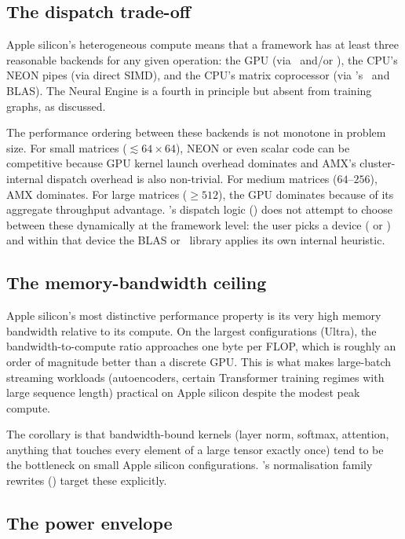 \subsection{The dispatch trade-off}
\label{ssec:apple_silicon:ml_dispatch}

Apple silicon's heterogeneous compute means that a framework has at
least three reasonable backends for any given operation: the GPU
(via \MLX\ and/or \MPSGraph), the CPU's NEON pipes (via direct
SIMD), and the CPU's matrix coprocessor (via \Accelerate's \BNNS\
and BLAS). The Neural Engine is a fourth in principle but absent
from training graphs, as discussed.

The performance ordering between these backends is not monotone in
problem size. For small matrices ($\lesssim 64\times 64$), NEON or
even scalar code can be competitive because GPU kernel launch
overhead dominates and AMX's cluster-internal dispatch overhead is
also non-trivial. For medium matrices ($64$--$256$), AMX dominates.
For large matrices ($\geq 512$), the GPU dominates because of its
aggregate throughput advantage. \Lucid's dispatch logic
() does not attempt to choose between
these dynamically at the framework level: the user picks a device
(\code{cpu} or \code{metal}) and within that device the BLAS or
\MLX\ library applies its own internal heuristic.

\subsection{The memory-bandwidth ceiling}
\label{ssec:apple_silicon:ml_bw}

Apple silicon's most distinctive performance property is its very
high memory bandwidth relative to its compute. On the largest
configurations (Ultra), the bandwidth-to-compute ratio approaches one
byte per FLOP, which is roughly an order of magnitude better than a
discrete GPU. This is what makes large-batch streaming workloads
(autoencoders, certain Transformer training regimes with large
sequence length) practical on Apple silicon despite the modest peak
compute.

The corollary is that bandwidth-bound kernels (layer norm,
softmax, attention, anything that touches every element of a large
tensor exactly once) tend to be the bottleneck on small Apple
silicon configurations. \Lucid's normalisation family rewrites
() target these explicitly.

\subsection{The power envelope}
\label{ssec:apple_silicon:ml_power}

